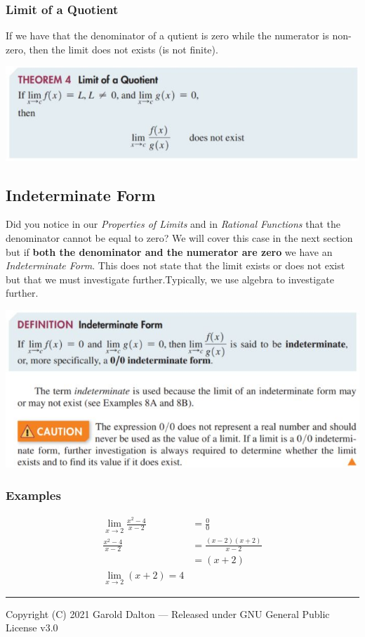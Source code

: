 \documentclass[14pt]{extarticle}
\begin{document}
\subsubsection{Limit of a Quotient} If we have that the denominator of a qutient is zero while the numerator is non-zero, then the limit does not exists (is not finite).
\begin{center}
	\includegraphics[width=0.9\linewidth]{9-1-6b}
\end{center}

\subsection{Indeterminate Form} Did you notice in our \textit{Properties of Limits} and in \textit{Rational Functions} that the denominator cannot be equal to zero? We will cover this case in the next section but if \textbf{both the denominator and the numerator are zero} we have an \textit{Indeterminate Form}. This does not state that the limit exists or does not exist but that we must investigate further.Typically, we use algebra to investigate further.
\begin{center}
	\includegraphics[width=0.9\linewidth]{9-1-6a}
\end{center}
\subsubsection{Examples}
\begin{align*}
	\lim_{x\to 2}\frac{x^2-4}{x-2} &= \frac{0}{0} \\
	\frac{x^2-4}{x-2} &= \frac{(x-2)(x+2)}{x-2} \tag{using algebra} \\
	&=(x+2) \\
	\lim_{x\to 2}(x+2) = 4
\end{align*}



\noindent\rule{\textwidth}{1pt}
{\footnotesize Copyright (C) 2021 Garold Dalton --- Released under GNU General Public License v3.0}


\cleardoublepage
\end{document}
